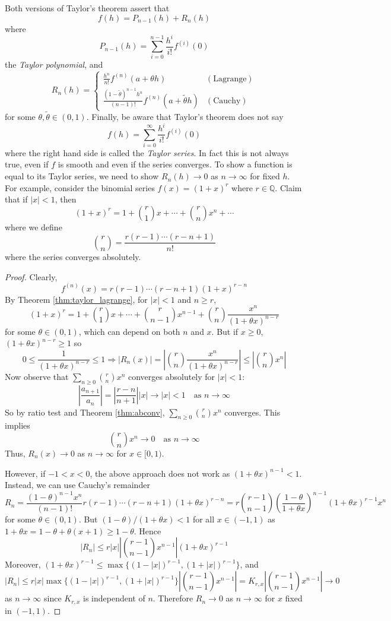 \documentclass[10pt, a4paper, twoside]{report}
\begin{document}
Both versions of Taylor's theorem assert that 
\[f(h)=P_{n-1}(h)+R_n(h)\]
where 
\[P_{n-1}(h)=\sum_{i=0}^{n-1}\frac{h^i}{i!}f^{(i)}(0)\]
the \emph{Taylor polynomial}, and
\[R_n(h)=\begin{cases}
    \frac{h^n}{n!}f^{(n)}(a+\theta h) & (\text{Lagrange}) \\
    \frac{(1-\tilde{\theta})^{n-1}h^n}{(n-1)!}f^{(n)}(a+\tilde{\theta}h) & (\text{Cauchy})
\end{cases}\] 
for some \(\theta,\tilde{\theta}\in(0,1)\). Finally, be aware that Taylor's theorem does not say 
\[f(h)=\sum_{i=0}^\infty\frac{h^i}{i!}f^{(i)}(0)\]
where the right hand side is called the \emph{Taylor series}.
In fact this is not always true, even if \(f\) is smooth and even if the series converges. To show a function is equal to its Taylor series, we need to show \(R_n(h)\to 0\) as \(n\to\infty\) for fixed \(h\). For example, consider the binomial series \(f(x)=(1+x)^r\) where \(r\in\mathbb{Q}\). Claim that if \(|x|<1\), then 
\[(1+x)^r=1+\binom{r}{1}x+\cdots+\binom rnx^n+\cdots\]
where we define 
\[\binom rn=\frac{r(r-1)\cdots(r-n+1)}{n!}\]
where the series converges absolutely.
\begin{proof}
    Clearly,
    \[f^{(n)}(x)=r(r-1)\cdots(r-n+1)(1+x)^{r-n}\]
    By Theorem \ref{thm:taylor_lagrange}, for \(|x|<1\) and \(n\geq r\),
    \[(1+x)^r=1+\binom{r}{1}x+\cdots+\binom r{n-1}x^{n-1}+\binom rn\frac{x^n}{(1+\theta x)^{n-r}}\]
    for some \(\theta\in(0,1)\), which can depend on both \(n\) and \(x\). But if \(x\geq 0\), \((1+\theta x)^{n-r}\geq 1\) so 
    \[0\leq\frac{1}{(1+\theta x)^{n-r}}\leq 1\Rightarrow|R_n(x)|=\left|\binom rn\frac{x^n}{(1+\theta x)^{n-r}}\right|\leq\left|\binom rnx^n\right|\]
    Now observe that \(\sum_{n\geq 0}{\binom rnx^n}\) converges absolutely for \(|x|<1\):
    \[\left|\frac{a_{n+1}}{a_n}\right|=\left|\frac{r-n}{n+1}\right||x|\to|x|<1\quad\text{as  }n\to\infty\]
    So by ratio test and Theorem \ref{thm:abconv}, \(\sum_{n\geq 0}{\binom rnx^n}\) converges. This implies 
    \[\binom rnx^n\to 0\quad\text{as  }n\to\infty\]
    Thus, \(R_n(x)\to 0\) as \(n\to\infty\) for \(x\in[0,1)\).

    However, if \(-1<x<0\), the above approach does not work as \((1+\theta x)^{n-1}<1\). Instead, we can use Cauchy's remainder 
    \[R_n=\frac{(1-\theta)^{n-1}x^n}{(n-1)!}r(r-1)\cdots(r-n+1)(1+\theta x)^{r-n}=r\binom{r-1}{n-1}\left(\frac{1-\theta}{1+\theta x}\right)^{n-1}(1+\theta x)^{r-1}x^n\]
    for some \(\theta\in(0,1)\). But \((1-\theta)/(1+\theta x)<1\) for all \(x\in(-1,1)\) as \(1+\theta x=1-\theta +\theta(x+1)\geq 1-\theta\). Hence 
    \[|R_n|\leq r|x|\left|\binom{r-1}{n-1}x^{n-1}\right|(1+\theta x)^{r-1}\]
    Moreover, \((1+\theta x)^{r-1}\leq\max\{(1-|x|)^{r-1},(1+|x|)^{r-1}\}\), and 
    \[|R_n|\leq r|x|\max\{(1-|x|)^{r-1},(1+|x|)^{r-1}\}\left|\binom{r-1}{n-1}x^{n-1}\right|=K_{r,x}\left|\binom{r-1}{n-1}x^{n-1}\right|\to 0\] as \(n\to\infty\) since \(K_{r,x}\) is independent of \(n\). Therefore \(R_n\to 0\) as \(n\to\infty\) for \(x\) fixed in \((-1,1)\).
\end{proof}
\end{document}
